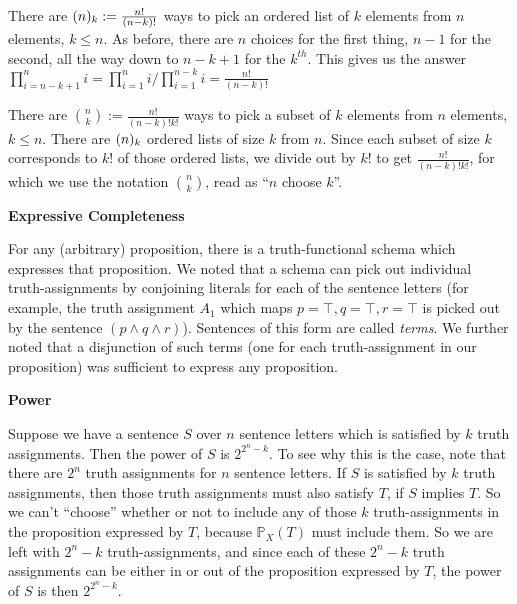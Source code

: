 \begin{mdframed}[linewidth=1]
There are $\mbox{$(n)_{k}$} := \frac{n!}{(n-k)!}$ ways to pick an ordered list of $k$ elements from $n$ elements, $k \leq n$. As before, there are $n$ choices for the first thing, $n-1$ for the second, all the way down to $n-k+1$ for the $k^{th}$. This gives us the answer $\prod_{i = n - k + 1}^ni = \prod_{i = 1}^ni / \prod_{i = 1}^{n - k}i = \frac{n!}{(n-k)!}$   

There are $\binom{n}{k} := \frac{n!}{(n-k)!k!}$ ways to pick a subset of $k$ elements from $n$ elements, $k \leq n$. There are $\mbox{$(n)_{k}$}$ ordered lists of size $k$ from $n$. Since each subset of size $k$ corresponds to $k!$  of those ordered lists, we divide out by $k!$ to get $\frac{n!}{(n-k)!k!}$, for which we use the notation $\binom{n}{k}$, read as ``$n$ choose $k$''. 

\textbf{Expressive Completeness}

For any (arbitrary) proposition, there is a truth-functional schema which expresses that proposition. We noted that a schema can pick out individual truth-assignments by conjoining literals for each of the sentence letters (for example, the truth assignment $A_1$ which maps $p = \top, q = \top, r = \top$ is picked out by the sentence $(p \land q \land r)$). Sentences of this form are called \emph{terms}. We further noted that a disjunction of such terms (one for each truth-assignment in our proposition) was sufficient to express any proposition. 

\textbf{Power}

Suppose we have a sentence $S$ over $n$ sentence letters which is satisfied by $k$ truth assignments. Then the power of $S$ is $2^{2^n - k}$. To see why this is the case, note that there are $2^n$ truth assignments for $n$ sentence letters. If $S$ is satisfied by $k$ truth assignments, then those truth assignments must also satisfy $T$,  if $S$ implies $T$. So we can't ``choose'' whether or not to include any of those $k$ truth-assignments in the proposition expressed by $T$, because $\mathbb{P}_X(T)$ must include them. So we are left with $2^n - k$ truth-assignments, and since each of these $2^n - k$ truth assignments can be either in or out of the proposition expressed by $T$, the power of $S$ is then $2^{2^n - k}$.
\end{mdframed}

